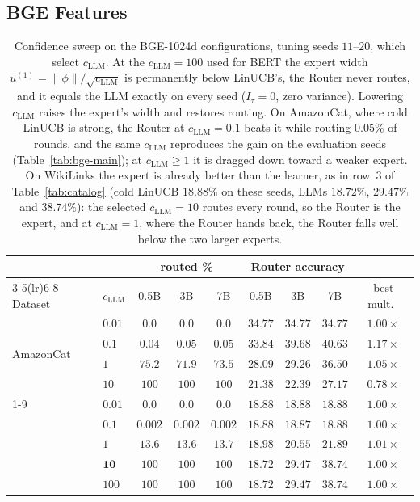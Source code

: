 \documentclass[anon]{alt2027} %
\begin{document}
\subsection{BGE Features}
\label{app:bge}

\begin{table}[h]
\centering
\caption{Confidence sweep on the BGE-1024d configurations, tuning seeds
$11$--$20$, which select $c_{\mathrm{LLM}}$. At the
$c_{\mathrm{LLM}}=100$ used for BERT the expert width $u^{(1)}=\|\phi\|/\sqrt{c_{\mathrm{LLM}}}$ is
permanently below LinUCB's, the Router never routes, and it equals the
LLM exactly on every seed ($I_\tau=0$, zero variance). Lowering $c_{\mathrm{LLM}}$ raises the
expert's width and restores routing. On AmazonCat, where cold LinUCB is
strong, the Router at $c_{\mathrm{LLM}}=0.1$ beats it while routing $0.05\%$ of rounds, and
the same $c_{\mathrm{LLM}}$ reproduces the gain on the evaluation seeds
(Table~\ref{tab:bge-main}); at $c_{\mathrm{LLM}}\ge1$ it is dragged down toward a
weaker expert. On WikiLinks the expert is
already better than the learner, as in row~3 of Table~\ref{tab:catalog} (cold
LinUCB $18.88\%$ on these seeds, LLMs $18.72\%$, $29.47\%$ and $38.74\%$): the
selected $c_{\mathrm{LLM}}=10$ routes every round, so the Router is the expert, and at
$c_{\mathrm{LLM}}=1$, where the Router hands back, the Router falls well below the two
larger experts.}
\label{tab:bge-csweep}
\scriptsize
\setlength{\tabcolsep}{4pt}
\begin{tabular}{@{}llccccccc@{}}
\toprule
& & \multicolumn{3}{c}{routed \%} & \multicolumn{3}{c}{Router accuracy} & \\
\cmidrule(lr){3-5}\cmidrule(lr){6-8}
Dataset & $c_{\mathrm{LLM}}$ & 0.5B & 3B & 7B & 0.5B & 3B & 7B & best mult.\ \\
\midrule
\multirow{4}{*}{AmazonCat} & $0.01$ & $0.0$ & $0.0$ & $0.0$ & $34.77$ & $34.77$ & $34.77$ & $1.00\times$ \\
 & $\mathbf{0.1}$ & $0.04$ & $0.05$ & $0.05$ & $33.84$ & $39.68$ & $\mathbf{40.63}$ & $\mathbf{1.17\times}$ \\
 & $1$  & $75.2$ & $71.9$ & $73.5$ & $28.09$ & $29.26$ & $36.50$ & $1.05\times$ \\
 & $10$ & $100$ & $100$ & $100$ & $21.38$ & $22.39$ & $27.17$ & $0.78\times$ \\
\cmidrule(lr){1-9}
\multirow{5}{*}{WikiLinks} & $0.01$ & $0.0$ & $0.0$ & $0.0$ & $18.88$ & $18.88$ & $18.88$ & $1.00\times$ \\
 & $0.1$ & $0.002$ & $0.002$ & $0.002$ & $18.88$ & $18.87$ & $18.88$ & $1.00\times$ \\
 & $1$  & $13.6$ & $13.6$ & $13.7$ & $18.98$ & $20.55$ & $21.89$ & $1.01\times$ \\
 & $\mathbf{10}$ & $100$ & $100$ & $100$ & $18.72$ & $29.47$ & $\mathbf{38.74}$ & $1.00\times$ \\
 & $100$ & $100$ & $100$ & $100$ & $18.72$ & $29.47$ & $38.74$ & $1.00\times$ \\
\bottomrule
\end{tabular}
\end{table}
\end{document}
